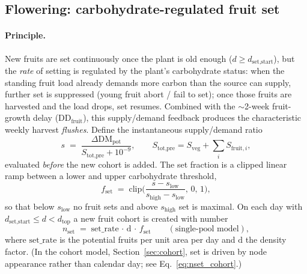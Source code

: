 \documentclass[11pt,a4paper]{article}
\begin{document}
\subsection{Flowering: carbohydrate-regulated fruit set}\label{sec:flowering}
\paragraph{Principle.} New fruits are set continuously once the plant is old enough
($d\ge d_{\text{set,start}}$), but the \emph{rate} of setting is regulated by the plant's
carbohydrate status: when the standing fruit load already demands more carbon than the source can
supply, further set is suppressed (young fruit abort / fail to set); once those fruits are harvested
and the load drops, set resumes. Combined with the $\sim$2-week fruit-growth delay
($\mathrm{DD}_{\text{fruit}}$), this supply/demand feedback produces the characteristic weekly
harvest \emph{flushes}. Define the instantaneous supply/demand ratio
\begin{equation}
  s \;=\; \frac{\Delta\mathrm{DM}_{\text{pot}}}{S_{\text{tot,pre}} + 10^{-9}},
  \qquad S_{\text{tot,pre}} = S_{\text{veg}} + \textstyle\sum_i S_{\text{fruit},i},
\end{equation}
evaluated \emph{before} the new cohort is added. The set fraction is a clipped linear ramp between a
lower and upper carbohydrate threshold,
\begin{equation}
  f_{\text{set}} \;=\; \mathrm{clip}\!\Big(\frac{s - s_{\text{low}}}{s_{\text{high}} - s_{\text{low}}},\,0,\,1\Big),
  \label{eq:setfrac}
\end{equation}
so that below $s_{\text{low}}$ no fruit sets and above $s_{\text{high}}$ set is maximal. On each day
with $d_{\text{set,start}}\le d<d_{\text{top}}$ a new fruit cohort is created with number
\begin{equation}
  n_{\text{set}} \;=\; \mathrm{set\_rate}\,\cdot\,\mathrm{d}\,\cdot\, f_{\text{set}}
  \qquad(\text{single-pool model}),
  \label{eq:nset}
\end{equation}
where $\mathrm{set\_rate}$ is the potential fruits per unit area per day and $\mathrm{d}$ the density
factor. (In the cohort model, Section~\ref{sec:cohort}, set is driven by node appearance rather than
calendar day; see Eq.~\eqref{eq:nset_cohort}.)
\end{document}

